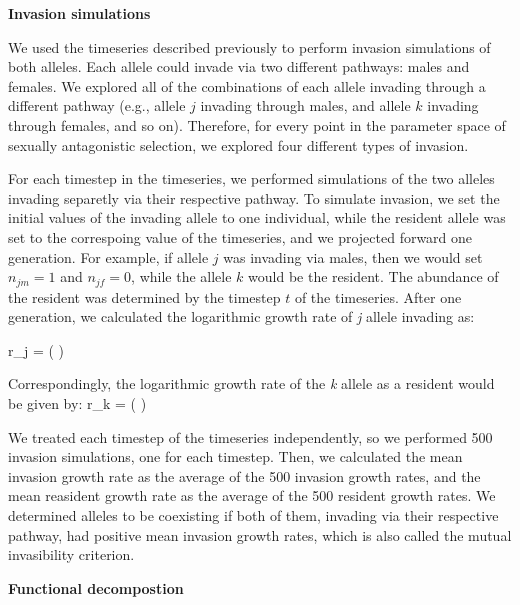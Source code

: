 \documentclass[12pt]{article}
\let\oldequation\equation
\let\oldendequation\endequation
\renewenvironment{equation}
  {\linenomathNonumbers\oldequation}
  {\oldendequation\endlinenomath}
\begin{document}
\vspace{5mm}
\noindent\textbf{Invasion simulations}

We used the timeseries described previously to perform invasion simulations of both alleles. Each allele could invade via two different pathways: males and females. We explored all of the combinations of each allele invading through a different pathway (e.g., allele $j$ invading through males, and allele $k$ invading through females, and so on). Therefore, for every point in the parameter space of sexually antagonistic selection, we explored four different types of invasion.

For each timestep in the timeseries, we performed simulations of the two alleles invading separetly via their respective pathway. To simulate invasion, we set the initial values of the invading allele to one individual, while the resident allele was set to the correspoing value of the timeseries, and we projected forward one generation. For example, if allele $j$ was invading via males, then we would set $n_{jm} = 1$ and $n_{jf}= 0$, while the allele $k$ would be the resident. The abundance of the resident was determined by the timestep $t$ of the timeseries. After one generation, we calculated the logarithmic growth rate of \textit{j} allele invading as:

\begin{equation}
r_{j} =	\ln \left (  \right )
\label{invader}
\end{equation}

Correspondingly, the logarithmic growth rate of the \textit{k} allele as a resident would be given by:
\begin{equation}
r_{k} =	\ln \left (  \right )
\label{resident}
\end{equation}

We treated each timestep of the timeseries independently, so we performed 500 invasion simulations, one for each timestep. Then, we calculated the mean invasion growth rate as the average of the 500 invasion growth rates, and the mean reasident growth rate as the average of the 500 resident growth rates. We determined alleles to be coexisting if both of them, invading via their respective pathway, had positive  mean invasion growth rates, which is also called the mutual invasibility criterion.

\vspace{5mm}
\noindent\textbf{Functional decompostion}
\end{document}

